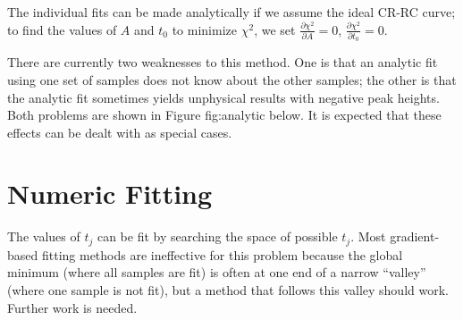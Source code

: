 The individual fits can be made analytically if we assume the ideal CR-RC curve; to find the values of $A$ and $t_0$ to minimize $\chi^2$, we set $\frac{\partial\chi^2}{\partial A}=0$, $\frac{\partial\chi^2}{\partial t_0}=0$.

There are currently two weaknesses to this method. One is that an analytic fit using one set of samples does not know about the other samples; the other is that the analytic fit sometimes yields unphysical results with negative peak heights. Both problems are shown in Figure fig:analytic below. It is expected that these effects can be dealt with as special cases.


\section{Numeric Fitting}
The values of $t_j$ can be fit by searching the space of possible $t_j$. 
Most gradient-based fitting methods are ineffective for this problem because the global minimum (where all samples are fit) is often at one end of a narrow ``valley'' (where one sample is not fit), but a method that follows this valley should work. Further work is needed.


